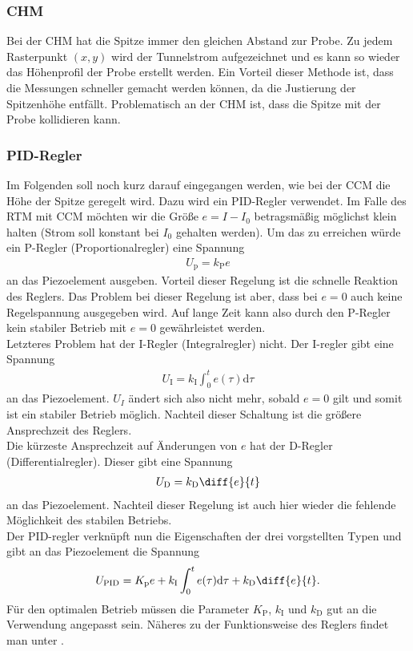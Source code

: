 \subsubsection{CHM}
Bei der CHM hat die Spitze immer den gleichen Abstand zur Probe. Zu jedem Rasterpunkt $(x,y)$ wird der Tunnelstrom aufgezeichnet und es kann so wieder das Höhenprofil der Probe erstellt werden. Ein Vorteil dieser Methode ist, dass die Messungen schneller gemacht werden können, da die Justierung der Spitzenhöhe entfällt. Problematisch an der CHM ist, dass die Spitze mit der Probe kollidieren kann.

\subsubsection{PID-Regler}
Im Folgenden soll noch kurz darauf eingegangen werden, wie bei der CCM die Höhe der Spitze geregelt wird. Dazu wird ein PID-Regler verwendet. Im Falle des RTM mit CCM möchten wir die Größe $e=I-I_0$ betragsmäßig möglichst klein halten (Strom soll konstant bei $I_0$ gehalten werden). Um das zu erreichen würde ein P-Regler (Proportionalregler) eine Spannung 
\begin{align*}
  U_\mathrm{p}=k_\mathrm{P}e
\end{align*} 
an das Piezoelement ausgeben. Vorteil dieser Regelung ist die schnelle Reaktion des Reglers. Das Problem bei dieser Regelung ist aber, dass bei $e=0$ auch keine Regelspannung ausgegeben wird. Auf lange Zeit kann also durch den P-Regler kein stabiler Betrieb mit $e=0$ gewährleistet werden.\\
Letzteres Problem hat der I-Regler (Integralregler) nicht. Der I-regler gibt eine Spannung
\begin{align*}
  U_\mathrm{I}=k_\mathrm{I}\int_0^t e(\tau) \mathrm{d}\tau 
\end{align*}
an das Piezoelement. $U_I$ ändert sich also nicht mehr, sobald $e=0$ gilt und somit ist ein stabiler Betrieb möglich. Nachteil dieser Schaltung ist die größere Ansprechzeit des Reglers. \\
Die kürzeste Ansprechzeit auf Änderungen von $e$ hat der D-Regler (Differentialregler). Dieser gibt eine Spannung 
\begin{align*}
  U_\mathrm{D}=k_\mathrm{D} \diff{e}{t}
\end{align*}
an das Piezoelement. Nachteil dieser Regelung ist auch hier wieder die fehlende Möglichkeit des stabilen Betriebs. \\
Der PID-regler verknüpft nun die Eigenschaften der drei vorgstellten Typen und gibt an das Piezoelement die Spannung
\begin{align*}
  U_\mathrm{PID}=K_\mathrm{p}e + k_\mathrm{I}\int_0^t e(\tau) \mathrm{d}\tau + k_\mathrm{D} \diff{e}{t}.
\end{align*}
Für den optimalen Betrieb müssen die Parameter $K_\mathrm{P}$, $k_\mathrm{I}$ und $k_\mathrm{D}$ gut an die Verwendung angepasst sein. Näheres zu der Funktionsweise des Reglers findet man unter \cite{PID}.

